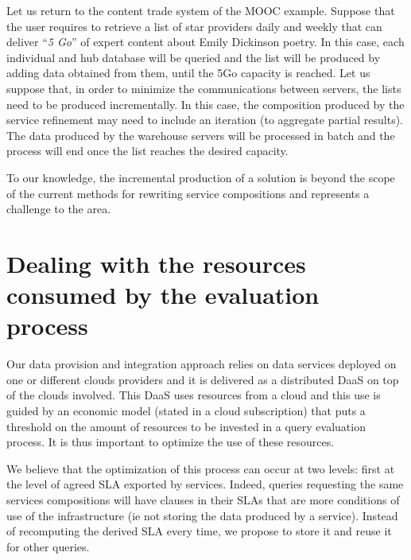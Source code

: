 \color{red}
\begin{example}\label{Ex:rew2}
Let us return to the content  trade system of the MOOC example.
 Suppose that the user requires to retrieve a list of star providers  daily and weekly that can deliver ``\textit{5 Go}'' of expert content about Emily Dickinson poetry.
In this case, each individual and hub database will be queried and the list will be produced by adding data obtained from them, until the 5Go  capacity is reached.
Let us suppose that, in order to minimize the  communications between servers, the lists need to be produced incrementally.
In this case, the composition produced by the service refinement may need to include an iteration (to aggregate partial results). 
The data produced by the warehouse servers will be processed in batch and the process will end once the list reaches the desired capacity.

To our knowledge, the incremental production of a solution is beyond  the scope of the current methods for rewriting service compositions and represents a challenge to the area.
~\hfill\openbox
\end{example}

\color{black}

 
\section{Dealing with the resources consumed by the evaluation process}
\label{sec:queryProcessOpt}
 Our data provision and integration approach relies on data services deployed on one or different clouds providers and it is delivered as a distributed DaaS on top of the clouds involved.  This DaaS  uses resources from a cloud and this use  is  guided by an economic model (stated in a cloud subscription) that puts a threshold on the amount of resources to be invested in a query evaluation process. It is thus important to optimize the use of these resources.
   
 We believe that the optimization of this process can occur at two levels: first at the level of agreed SLA exported by services.  Indeed, queries requesting the same services compositions will have clauses in their SLAs that are more conditions of use of the infrastructure (ie not storing the data produced by a service). Instead of recomputing the derived SLA every time, we propose to store it and reuse it for other queries. 
 
